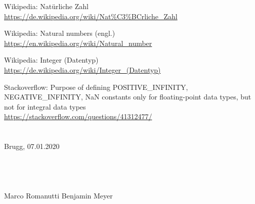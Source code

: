 \documentclass[10pt, a4paper, twocolumn]{article} %
\begin{document}
\begin{thebibliography}{9}
    Wikipedia: Natürliche Zahl\\
    \url{https://de.wikipedia.org/wiki/Nat\%C3\%BCrliche_Zahl}

    Wikipedia: Natural numbers (engl.)\\
    \url{https://en.wikipedia.org/wiki/Natural_number}

    Wikipedia: Integer (Datentyp)\\
    \url{https://de.wikipedia.org/wiki/Integer_(Datentyp)}

    Stackoverflow: Purpose of defining POSITIVE\_INFINITY, NEGATIVE\_INFINITY, NaN constants only for floating-point data types, but not for integral data types\\
    \url{https://stackoverflow.com/questions/41312477/}
\end{thebibliography}

\clearpage
\section*{}
\vspace{18cm}
Brugg, 07.01.2020
\\
\\
\\
\\
\\
Marco Romanutti \hfill Benjamin Meyer




\clearpage
\appendix
\onecolumn
\end{document}
